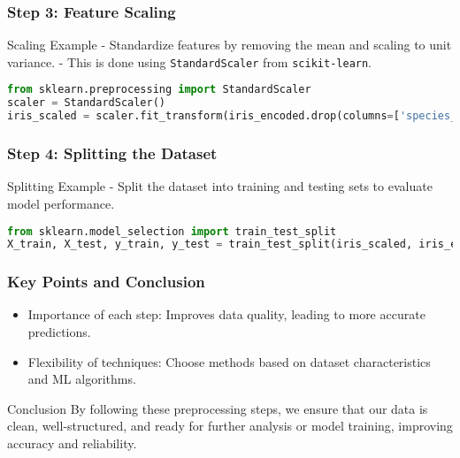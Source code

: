 \documentclass[aspectratio=169]{beamer}
\begin{document}
\begin{frame}[fragile]
  \frametitle{Step 3: Feature Scaling}
  
  \begin{block}{Scaling Example}
    - Standardize features by removing the mean and scaling to unit variance.
    - This is done using \texttt{StandardScaler} from \texttt{scikit-learn}.
  \end{block}
  
  \begin{lstlisting}[language=Python]
from sklearn.preprocessing import StandardScaler
scaler = StandardScaler()
iris_scaled = scaler.fit_transform(iris_encoded.drop(columns=['species_versicolor', 'species_virginica']))  # Keeping one category
  \end{lstlisting}
\end{frame}

\begin{frame}[fragile]
  \frametitle{Step 4: Splitting the Dataset}
  
  \begin{block}{Splitting Example}
    - Split the dataset into training and testing sets to evaluate model performance.
  \end{block}
  
  \begin{lstlisting}[language=Python]
from sklearn.model_selection import train_test_split
X_train, X_test, y_train, y_test = train_test_split(iris_scaled, iris_encoded[['species_versicolor', 'species_virginica']], test_size=0.2, random_state=42)
  \end{lstlisting}
\end{frame}

\begin{frame}[fragile]
  \frametitle{Key Points and Conclusion}
  
  \begin{itemize}
    \item Importance of each step: Improves data quality, leading to more accurate predictions.
    \item Flexibility of techniques: Choose methods based on dataset characteristics and ML algorithms.
  \end{itemize}
  
  \begin{block}{Conclusion}
    By following these preprocessing steps, we ensure that our data is clean, well-structured, and ready for further analysis or model training, improving accuracy and reliability.
  \end{block}
\end{frame}
\end{document}
